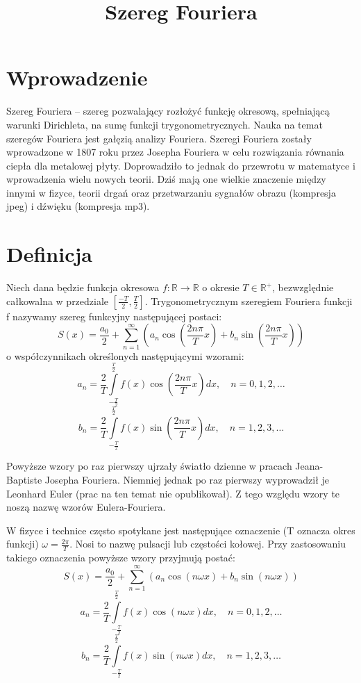 \documentclass{article}
\begin{document}
\title{Szereg Fouriera}
\maketitle

\section*{Wprowadzenie}
Szereg Fouriera – szereg pozwalający rozłożyć funkcję okresową, spełniającą warunki Dirichleta, na sumę funkcji trygonometrycznych. Nauka na temat szeregów Fouriera jest gałęzią analizy Fouriera. Szeregi Fouriera zostały wprowadzone w 1807 roku przez Josepha Fouriera w celu rozwiązania równania ciepła dla metalowej płyty. Doprowadziło to jednak do przewrotu w matematyce i wprowadzenia wielu nowych teorii. Dziś mają one wielkie znaczenie między innymi w fizyce, teorii drgań oraz przetwarzaniu sygnałów obrazu (kompresja jpeg) i dźwięku (kompresja mp3).

\section*{Definicja}
Niech dana będzie funkcja okresowa \( f\colon \mathbb {R} \to \mathbb {R} \)  o okresie \( T\in \mathbb {R} ^{+} \), bezwzględnie całkowalna w przedziale \( \left[{\frac {-T}{2}},{\frac {T}{2}}\right] \).
Trygonometrycznym szeregiem Fouriera funkcji f nazywamy szereg funkcyjny następującej postaci: 
\[ S(x)={\frac {a_{0}}{2}}+\sum _{n=1}^{\infty }\left(a_{n}\cos \left({\frac {2n\pi }{T}}x\right)+b_{n}\sin \left({\frac {2n\pi }{T}}x\right)\right) \]
o współczynnikach określonych następującymi wzorami: 
\[ a_{n}={\frac {2}{T}}\int \limits _{-{\frac {T}{2}}}^{\frac {T}{2}}f(x)\cos \left({\frac {2n\pi }{T}}x\right)dx,\quad n=0,1,2,\dots \]
\[ b_{n}={\frac {2}{T}}\int \limits _{-{\frac {T}{2}}}^{\frac {T}{2}}f(x)\sin \left({\frac {2n\pi }{T}}x\right)dx,\quad n=1,2,3,\dots \]

Powyższe wzory po raz pierwszy ujrzały światło dzienne w pracach Jeana-Baptiste Josepha Fouriera. Niemniej jednak po raz pierwszy wyprowadził je Leonhard Euler (prac na ten temat nie opublikował). Z tego względu wzory te noszą nazwę wzorów Eulera-Fouriera. 

W fizyce i technice często spotykane jest następujące oznaczenie (T oznacza okres funkcji) $ \omega ={\frac {2\pi }{T}} $. Nosi to nazwę pulsacji lub częstości kołowej. Przy zastosowaniu takiego oznaczenia powyższe wzory przyjmują postać: 
\begin{equation*}
S(x)={\frac {a_{0}}{2}}+\sum _{n=1}^{\infty }\left(a_{n}\cos \left(n\omega x\right)+b_{n}\sin \left(n\omega x\right)\right)
\end{equation*}
\begin{equation*}
a_{n}={\frac {2}{T}}\int \limits _{-{\frac {T}{2}}}^{\frac {T}{2}}f(x)\cos \left(n\omega x\right)dx,\quad n=0,1,2,\dots
\end{equation*}
\begin{equation*}
b_{n}={\frac {2}{T}}\int \limits _{-{\frac {T}{2}}}^{\frac {T}{2}}f(x)\sin \left(n\omega x\right)dx,\quad n=1,2,3,\dots
\end{equation*}
\end{document}
